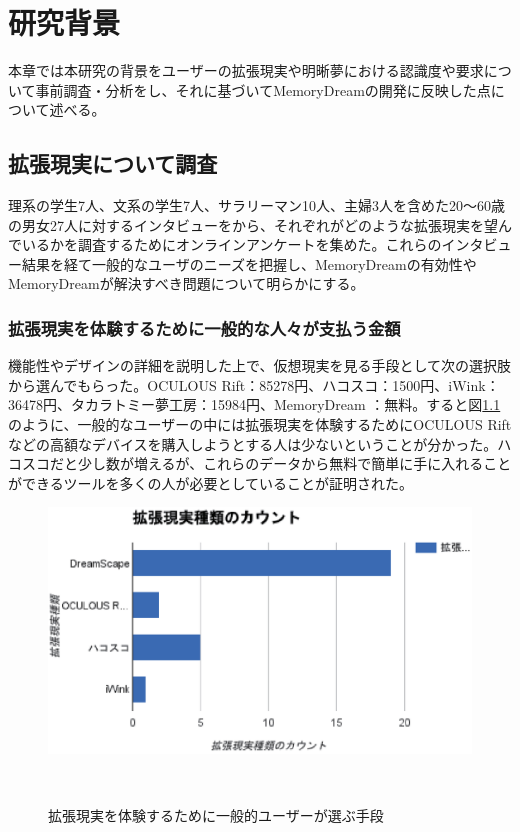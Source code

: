 \chapter{研究背景}
\label{chap:webapi}

本章では本研究の背景をユーザーの拡張現実や明晰夢における認識度や要求について事前調査・分析をし、それに基づいてMemoryDreamの開発に反映した点について述べる。

\section{拡張現実について調査}
理系の学生7人、文系の学生7人、サラリーマン10人、主婦3人を含めた20〜60歳の男女27人に対するインタビューをから、それぞれがどのような拡張現実を望んでいるかを調査するためにオンラインアンケートを集めた。これらのインタビュー結果を経て一般的なユーザのニーズを把握し、MemoryDreamの有効性やMemoryDreamが解決すべき問題について明らかにする。

\subsection{拡張現実を体験するために一般的な人々が支払う金額}
機能性やデザインの詳細を説明した上で、仮想現実を見る手段として次の選択肢から選んでもらった。OCULOUS Rift：85278円、ハコスコ：1500円、iWink：36478円、タカラトミー夢工房：15984円、MemoryDream ：無料。すると図\ref{userNeedCost}のように、一般的なユーザーの中には拡張現実を体験するためにOCULOUS Riftなどの高額なデバイスを購入しようとする人は少ないということが分かった。ハコスコだと少し数が増えるが、これらのデータから無料で簡単に手に入れることができるツールを多くの人が必要としていることが証明された。

\begin{figure}[htbp]
\begin{center}
\includegraphics[width=15cm]{eps/VRselection.eps}
\caption{拡張現実を体験するために一般的ユーザーが選ぶ手段}
　\label{userNeedCost}
\end{center}
\end{figure}

